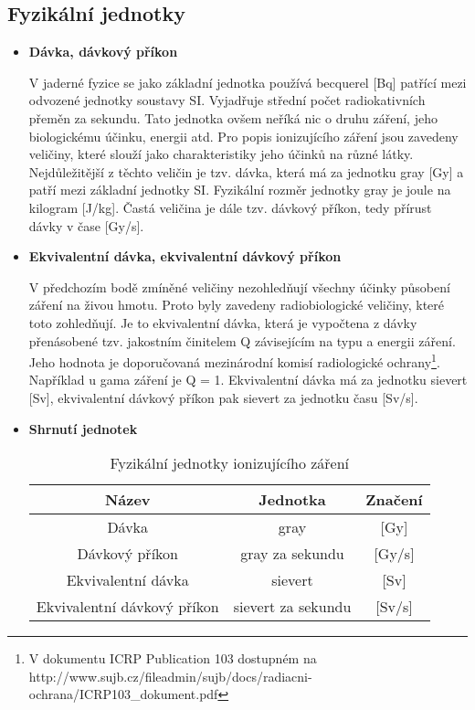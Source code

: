 \subsection{Fyzikální jednotky} %

\begin{itemize}
	\item \textbf{Dávka, dávkový příkon}
	
		V jaderné fyzice se jako základní jednotka používá becquerel [Bq] patřící mezi odvozené jednotky soustavy SI. Vyjadřuje střední počet radiokativních přeměn za sekundu. Tato jednotka ovšem neříká nic o druhu záření, jeho biologickému účinku, energii atd. Pro popis ionizujícího záření jsou zavedeny veličiny, které slouží jako charakteristiky jeho účinků na různé látky. Nejdůležitější z těchto veličin je tzv. dávka, která má za jednotku gray [Gy] a patří mezi základní jednotky SI. Fyzikální rozměr jednotky gray je joule na kilogram [J/kg]. Častá veličina je dále tzv. dávkový příkon, tedy přírust dávky v čase [Gy/s]. 
		
	\item \textbf{Ekvivalentní dávka, ekvivalentní dávkový příkon}

	 	V předchozím bodě zmíněné veličiny nezohledňují všechny účinky působení záření na živou hmotu. Proto byly zavedeny radiobiologické veličiny, které toto zohledňují. Je to ekvivalentní dávka, která je vypočtena z dávky přenásobené tzv. jakostním činitelem Q závisejícím na typu a energii záření. Jeho hodnota je doporučovaná mezinárodní komisí radiologické ochrany\footnote{V dokumentu ICRP Publication 103 dostupném na http://www.sujb.cz/fileadmin/sujb/docs/radiacni-ochrana/ICRP103\_dokument.pdf}. Například u gama záření je Q = 1. Ekvivalentní dávka má za jednotku sievert [Sv], ekvivalentní dávkový příkon pak sievert za jednotku času [Sv/s].
	 	
	\item \textbf{Shrnutí jednotek}
	
		\begin{table}[h!]
			\centering
			\caption{Fyzikální jednotky ionizujícího záření}
			\label{tab:tabulkaJednotek}
			\begin{tabular}{|c|c|c|}
				\hline
				\textbf{Název}              & \textbf{Jednotka}  & \textbf{Značení} \\ \hline
				Dávka                       & gray               & {[}Gy{]}         \\ \hline
				Dávkový příkon              & gray za sekundu    & {[}Gy/s{]}       \\ \hline
				Ekvivalentní dávka          & sievert            & {[}Sv{]}         \\ \hline
				Ekvivalentní dávkový příkon & sievert za sekundu & {[}Sv/s{]}       \\ \hline
			\end{tabular}
		\end{table}
\end{itemize}

